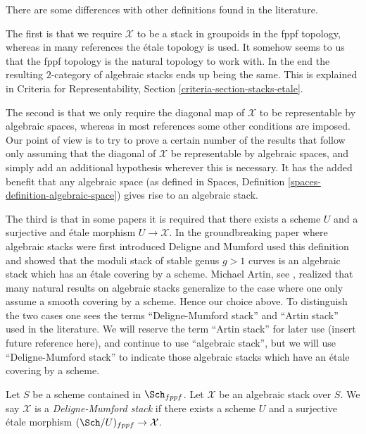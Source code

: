 \noindent
There are some differences with other definitions found in the literature.

\medskip\noindent
The first is that we require $\mathcal{X}$ to be a stack in groupoids
in the fppf topology, whereas in many references the \'etale topology is
used. It somehow seems to us that the fppf topology is the natural topology
to work with. In the end the resulting $2$-category of algebraic stacks
ends up being the same. This is explained in
Criteria for Representability, Section \ref{criteria-section-stacks-etale}.

\medskip\noindent
The second is that we only require the diagonal map of $\mathcal{X}$ to be
representable by algebraic spaces, whereas in most references some other
conditions are imposed. Our point of view is to try to prove a certain
number of the results that follow only assuming that the diagonal
of $\mathcal{X}$ be representable by algebraic spaces, and simply add
an additional hypothesis wherever this is necessary. It has the added
benefit that any algebraic space (as defined in
Spaces, Definition \ref{spaces-definition-algebraic-space})
gives rise to an algebraic stack.

\medskip\noindent
The third is that in some papers it is required that there exists a
scheme $U$ and a surjective and \'etale morphism $U \to \mathcal{X}$.
In the groundbreaking paper \cite{DM} where algebraic stacks were first
introduced Deligne and Mumford used this definition and showed that
the moduli stack of stable genus $g > 1$ curves is an algebraic stack
which has an \'etale covering by a scheme. Michael Artin, see
\cite{ArtinVersal}, realized that many
natural results on algebraic stacks generalize to the case where one
only assume a smooth covering by a scheme. Hence our choice above.
To distinguish the two cases one sees the terms ``Deligne-Mumford stack''
and ``Artin stack'' used in the literature. We will reserve the term
``Artin stack'' for later use (insert future reference here), and continue
to use ``algebraic stack'', but we will use ``Deligne-Mumford stack''
to indicate those algebraic stacks which have an \'etale covering by a
scheme.

\begin{definition}
\label{definition-deligne-mumford}
Let $S$ be a scheme contained in $\Sch_{fppf}$.
Let $\mathcal{X}$ be an algebraic stack over $S$.
We say $\mathcal{X}$ is a {\it Deligne-Mumford stack} if there exists
a scheme $U$ and a surjective \'etale morphism
$(\Sch/U)_{fppf} \to \mathcal{X}$.
\end{definition}

